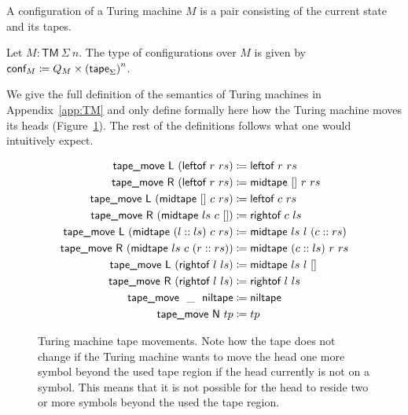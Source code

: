 A configuration of a Turing machine $M$ is a pair consisting of the current state and its tapes.
\begin{definition}[Configurations]
  Let $M : \textsf{TM}~\Sigma~n$. The type of configurations over $M$ is given by 
  $\textsf{conf}_{M} \coloneqq Q_{M} \times {(\textsf{tape}_{\Sigma})}^n$.
\end{definition}

We give the full definition of the semantics of Turing machines in Appendix~\ref{app:TM} and only define formally here how the Turing machine moves its heads (Figure~\ref{fig:movetape}). The rest of the definitions follows what one would intuitively expect.

\newcommand{\tmleftof}{\textsf{leftof}}
\newcommand{\tmrightof}{\textsf{rightof}}
\newcommand{\tmniltape}{\textsf{niltape}}
\newcommand{\tmmidtape}{\textsf{midtape}}
\newcommand{\tapemove}{\textsf{tape\_move}}
\begin{figure}
  \begin{align*}
    \tapemove~\movel~(\tmleftof~r~rs) &\defeq \tmleftof~r~rs \\
    \tapemove~\mover~(\tmleftof~r~rs) &\defeq \tmmidtape~\nil~r~rs \\
    \tapemove~\movel~(\tmmidtape~\nil~c~rs) &\defeq \tmleftof~c~rs \\
    \tapemove~\mover~(\tmmidtape~ls~c~\nil) &\defeq \tmrightof~c~ls \\
    \tapemove~\movel~(\tmmidtape~(l::ls)~c~rs) &\defeq \tmmidtape~ls~l~(c ::rs) \\
    \tapemove~\mover~(\tmmidtape~ls~c~(r::rs)) &\defeq \tmmidtape~(c::ls)~r~rs \\
    \tapemove~\movel~(\tmrightof~l~ls) &\defeq \tmmidtape~ls~l~\nil \\
    \tapemove~\mover~(\tmrightof~l~ls) &\defeq \tmrightof~l~ls \\
    \tapemove~~\_~~\tmniltape &\defeq \tmniltape \\
    \tapemove~\moven~tp &\defeq tp
  \end{align*}
  \caption{Turing machine tape movements. Note how the tape does not change if the Turing machine wants to move the head one more symbol beyond the used tape region if the head currently is not on a symbol. This means that it is not possible for the head to reside two or more symbols beyond the used the tape region.}\label{fig:movetape}
\end{figure}

